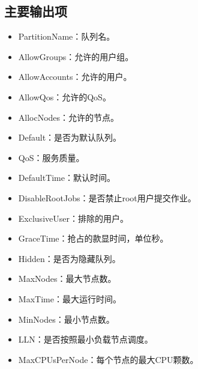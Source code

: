 \documentclass[a4paper,12pt,english]{sphinxmanual}
\begin{document}
\subsection{主要输出项}
\label{\detokenize{slurm/slurm:id13}}\label{\detokenize{slurm/slurm:id14}}\begin{itemize}
\item {} 
\sphinxAtStartPar
PartitionName：队列名。

\item {} 
\sphinxAtStartPar
AllowGroups：允许的用户组。

\item {} 
\sphinxAtStartPar
AllowAccounts：允许的用户。

\item {} 
\sphinxAtStartPar
AllowQos：允许的QoS。

\item {} 
\sphinxAtStartPar
AllocNodes：允许的节点。

\item {} 
\sphinxAtStartPar
Default：是否为默认队列。

\item {} 
\sphinxAtStartPar
QoS：服务质量。

\item {} 
\sphinxAtStartPar
DefaultTime：默认时间。

\item {} 
\sphinxAtStartPar
DisableRootJobs：是否禁止root用户提交作业。

\item {} 
\sphinxAtStartPar
ExclusiveUser：排除的用户。

\item {} 
\sphinxAtStartPar
GraceTime：抢占的款显时间，单位秒。

\item {} 
\sphinxAtStartPar
Hidden：是否为隐藏队列。

\item {} 
\sphinxAtStartPar
MaxNodes：最大节点数。

\item {} 
\sphinxAtStartPar
MaxTime：最大运行时间。

\item {} 
\sphinxAtStartPar
MinNodes：最小节点数。

\item {} 
\sphinxAtStartPar
LLN：是否按照最小负载节点调度。

\item {} 
\sphinxAtStartPar
MaxCPUsPerNode：每个节点的最大CPU颗数。


\end{itemize}
\end{document}

